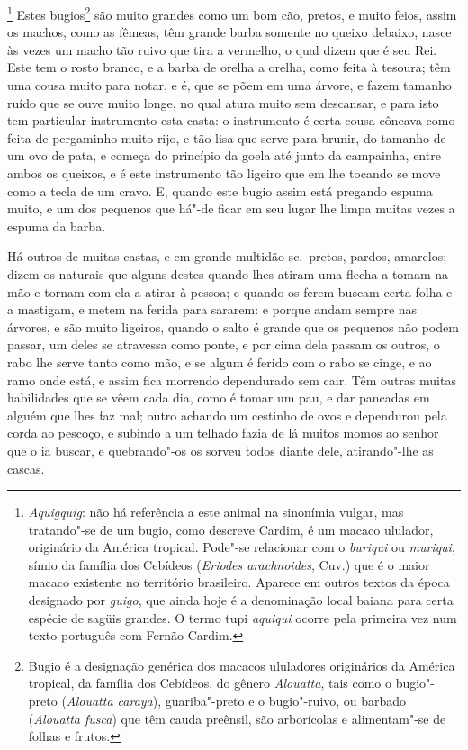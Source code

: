 \footnote{ \textit{Aquigquig}: não há
referência a este animal na sinonímia vulgar, mas tratando"-se de um
bugio, como descreve Cardim, é um macaco ululador, originário da
América tropical. Pode"-se relacionar com o \textit{buriqui} ou
\textit{muriqui}, símio da família dos Cebídeos (\textit{Eriodes 
arachnoides}, Cuv.) que é o maior macaco existente no território
brasileiro. Aparece em outros textos da época designado por
\textit{guigo}, que ainda hoje é a denominação local baiana para certa
espécie de sagüis grandes. O termo tupi \textit{aquiqui} ocorre pela
primeira vez num texto português com Fernão Cardim.} Estes
bugios\footnote{ Bugio é a designação genérica dos macacos
ululadores originários da América tropical, da família dos Cebídeos, 
do gênero \textit{Alouatta}, tais como o bugio"-preto (\textit{Alouatta
caraya}), guariba"-preto e o bugio"-ruivo, ou barbado 
(\textit{Alouatta fusca}) que têm cauda preênsil, são arborícolas e
alimentam"-se de folhas e frutos.} são muito grandes como um bom cão,
pretos, e muito feios, assim os machos, como as fêmeas, têm grande
barba somente no queixo debaixo, nasce às vezes um macho tão ruivo que
tira a vermelho, o qual dizem que é seu Rei. Este tem o rosto branco, e
a barba de orelha a orelha, como feita à tesoura; têm uma cousa muito
para notar, e é, que se põem em uma árvore, e fazem tamanho ruído que
se ouve muito longe, no qual atura muito sem descansar, e para isto tem
particular instrumento esta casta: o instrumento é certa cousa côncava
como feita de pergaminho muito rijo, e tão lisa que serve para brunir,
do tamanho de um ovo de pata, e começa do princípio da goela até junto
da campainha, entre ambos os queixos, e é este instrumento tão ligeiro
que em lhe tocando se move como a tecla de um cravo. E, quando este
bugio assim está pregando espuma muito, e um dos pequenos que há"-de
ficar em seu lugar lhe limpa muitas vezes a espuma da barba.

 Há outros de muitas castas, e em grande multidão sc.~pretos, pardos,
amarelos; dizem os naturais que alguns destes quando lhes atiram uma
flecha a tomam na mão e tornam com ela a atirar à pessoa; e quando os
ferem buscam certa folha e a mastigam, e metem na ferida para sararem:
e porque andam sempre nas árvores, e são muito ligeiros, quando o salto
é grande que os pequenos não podem passar, um deles se atravessa como
ponte, e por cima dela passam os outros, o rabo lhe serve tanto como
mão, e se algum é ferido com o rabo se cinge, e ao ramo onde está, e
assim fica morrendo dependurado sem cair. Têm outras muitas habilidades
que se vêem cada dia, como é tomar um pau, e dar pancadas em alguém que
lhes faz mal; outro achando um cestinho de ovos e dependurou pela corda
ao pescoço, e subindo a um telhado fazia de lá muitos momos ao senhor
que o ia buscar, e quebrando"-os os sorveu todos diante dele,
atirando"-lhe as cascas. 

